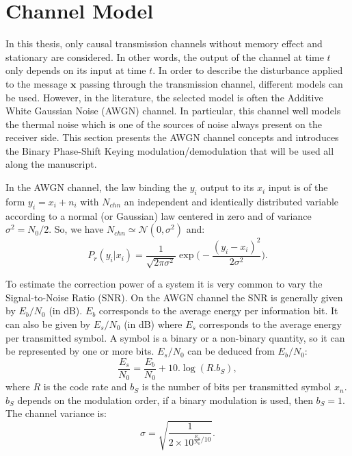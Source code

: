 \section{Channel Model}

In this thesis, only causal transmission channels without memory effect and
stationary are considered. In other words, the output of the channel at time $t$
only depends on its input at time $t$. In order to describe the disturbance
applied to the message $\bm{x}$ passing through the transmission channel,
different models can be used. However, in the literature, the selected model is
often the Additive White Gaussian Noise (AWGN) channel. In particular, this
channel well models the thermal noise which is one of the sources of noise
always present on the receiver side. This section presents the AWGN channel
concepts and introduces the Binary Phase-Shift Keying modulation/demodulation
that will be used all along the manuscript.

In the AWGN channel, the law binding the $y_i$ output to its $x_i$ input is of
the form $y_i = x_i + n_i$ with $N_{chn}$ an independent and identically
distributed variable according to a normal (or Gaussian) law centered in zero
and of variance $\sigma^2 = N_0 / 2$. So, we have $N_{chn} \simeq \mathcal{N}(0,
\sigma^2)$ and:
\begin{equation}
P_r(y_i|x_i) = \frac{1}{\sqrt{2\pi\sigma^2}}\exp{\Big(-\frac{(y_i-x_i)^2}{2\sigma^2}\Big)}.
\end{equation}

To estimate the correction power of a system it is very common to vary the
Signal-to-Noise Ratio (SNR). On the AWGN channel the SNR is generally given by
$E_b/N_0$ (in dB). $E_b$ corresponds to the average energy per information bit.
It can also be given by $E_s/N_0$ (in dB) where $E_s$ corresponds to the average
energy per transmitted symbol. A symbol is a binary or a non-binary quantity, so
it can be represented by one or more bits. $E_s/N_0$ can be deduced from
$E_b/N_0$:
\begin{equation}
\frac{E_s}{N_0} = \frac{E_b}{N_0} + 10.\log{(R.b_S)},
\end{equation}
where $R$ is the code rate and $b_S$ is the number of bits per transmitted
symbol $x_n$. $b_S$ depends on the modulation order, if a binary modulation is
used, then $b_S = 1$. The channel variance is:
\begin{equation}
\sigma = \sqrt{\frac{1}{2 \times 10^{\frac{E_s}{N_0} / 10}}}.
\end{equation}

